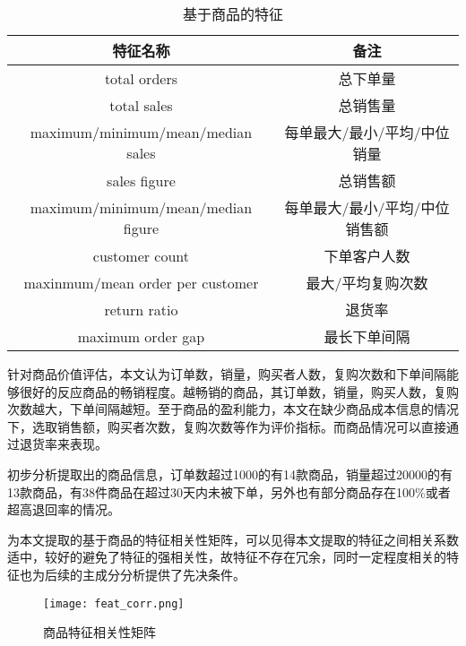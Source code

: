 \documentclass[lang=cn,11pt,a4paper,cite=authoryear]{elegantpaper}
\begin{document}
\begin{table}[!htb]
  \centering
  \caption{基于商品的特征}
    \huge
    \begin{tabular}{c|c}
    \hline
    \textbf{特征名称} & \textbf{备注} \\
    \hline
    total orders  & 总下单量 \\
    total sales    & 总销售量 \\
    maximum/minimum/mean/median sales & 每单最大/最小/平均/中位销量  \\
    sales figure   & 总销售额 \\
    maximum/minimum/mean/median figure & 每单最大/最小/平均/中位销售额 \\
    customer count & 下单客户人数 \\
    maxinmum/mean order per customer & 最大/平均复购次数 \\
    return ratio & 退货率 \\
    maximum order gap & 最长下单间隔 \\
    \hline
    \end{tabular}
  \label{基于商品的特征}
\end{table}

针对商品价值评估，本文认为订单数，销量，购买者人数，复购次数和下单间隔能够很好的反应商品的畅销程度。越畅销的商品，其订单数，销量，购买人数，复购次数越大，下单间隔越短。至于商品的盈利能力，本文在缺少商品成本信息的情况下，选取销售额，购买者次数，复购次数等作为评价指标。而商品情况可以直接通过退货率来表现。

初步分析提取出的商品信息，订单数超过1000的有14款商品，销量超过20000的有13款商品，有38件商品在超过30天内未被下单，另外也有部分商品存在100\%或者超高退回率的情况。

为本文提取的基于商品的特征相关性矩阵，可以见得本文提取的特征之间相关系数适中，较好的避免了特征的强相关性，故特征不存在冗余，同时一定程度相关的特征也为后续的主成分分析提供了先决条件。
\begin{figure}[H]
  \centering
  \texttt{[image: feat\_corr.png]}
  \caption{商品特征相关性矩阵}
  \label{商品特征相关性矩阵}
\end{figure}
\end{document}
